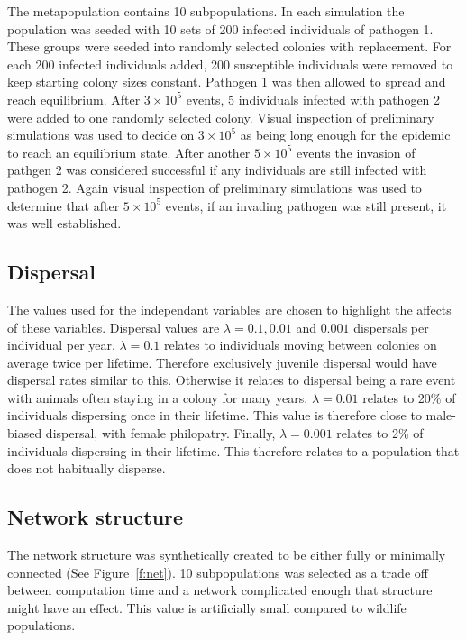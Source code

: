 The metapopulation contains 10 subpopulations.
In each simulation the population was seeded with 10 sets of 200 infected individuals of pathogen 1.
These groups were seeded into randomly selected colonies with replacement.
For each 200 infected individuals added, 200 susceptible individuals were removed to keep starting colony sizes constant. 
Pathogen 1 was then allowed to spread and reach equilibrium. 
After \ensuremath{3\times 10^{5}} events, 5 individuals infected with pathogen 2 were added to one randomly selected colony. 
Visual inspection of preliminary simulations was used to decide on \ensuremath{3\times 10^{5}} as being long enough for the epidemic to reach an equilibrium state.
After another \ensuremath{5\times 10^{5}} events the invasion of pathgen 2 was considered successful if any individuals are still infected with pathogen 2.
Again visual inspection of preliminary simulations was used to determine that after \ensuremath{5\times 10^{5}} events, if an invading pathogen was still present, it was well established. 


\subsection{Dispersal}

The values used for the independant variables are chosen to highlight the affects of these variables. 
Dispersal values are $\lambda = 0.1, 0.01$ and $ 0.001$ dispersals per individual per year. 
$\lambda = 0.1$ relates to individuals moving between colonies on average twice per lifetime. 
Therefore exclusively juvenile dispersal would have dispersal rates similar to this. %
Otherwise it relates to dispersal being a rare event with animals often staying in a colony for many years.
$\lambda = 0.01$ relates to 20\% of individuals dispersing once in their lifetime.
This value is therefore close to male-biased dispersal, with female philopatry. %
Finally, $\lambda = 0.001$ relates to 2\% of individuals dispersing in their lifetime.
This therefore relates to a population that does not habitually disperse.




\subsection{Network structure}
The network structure was synthetically created to be either fully or minimally connected (See Figure~\ref{f:net}). 
10 subpopulations was selected as a trade off between computation time and a network complicated enough that structure might have an effect. 
This value is artificially small compared to wildlife populations. 



